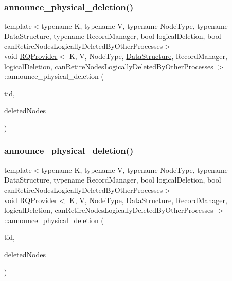 \subsubsection{\texorpdfstring{announce\+\_\+physical\+\_\+deletion()}{announce\_physical\_deletion()}\hspace{0.1cm}{\footnotesize\ttfamily [2/5]}}
{\footnotesize\ttfamily template$<$typename K, typename V, typename Node\+Type, typename Data\+Structure, typename Record\+Manager, bool logical\+Deletion, bool can\+Retire\+Nodes\+Logically\+Deleted\+By\+Other\+Processes$>$ \\
void \hyperlink{classRQProvider}{R\+Q\+Provider}$<$ K, V, Node\+Type, \hyperlink{classDataStructure}{Data\+Structure}, Record\+Manager, logical\+Deletion, can\+Retire\+Nodes\+Logically\+Deleted\+By\+Other\+Processes $>$\+::announce\+\_\+physical\+\_\+deletion (\begin{DoxyParamCaption}\item[{const int}]{tid,  }\item[{Node\+Type $\ast$const $\ast$const}]{deleted\+Nodes }\end{DoxyParamCaption})\hspace{0.3cm}{\ttfamily [inline]}}

\mbox{\label{classRQProvider_a29337e6766144d1c1a9aa752fe73fabf}} 
\subsubsection{\texorpdfstring{announce\+\_\+physical\+\_\+deletion()}{announce\_physical\_deletion()}\hspace{0.1cm}{\footnotesize\ttfamily [3/5]}}
{\footnotesize\ttfamily template$<$typename K, typename V, typename Node\+Type, typename Data\+Structure, typename Record\+Manager, bool logical\+Deletion, bool can\+Retire\+Nodes\+Logically\+Deleted\+By\+Other\+Processes$>$ \\
void \hyperlink{classRQProvider}{R\+Q\+Provider}$<$ K, V, Node\+Type, \hyperlink{classDataStructure}{Data\+Structure}, Record\+Manager, logical\+Deletion, can\+Retire\+Nodes\+Logically\+Deleted\+By\+Other\+Processes $>$\+::announce\+\_\+physical\+\_\+deletion (\begin{DoxyParamCaption}\item[{const int}]{tid,  }\item[{Node\+Type $\ast$const $\ast$const}]{deleted\+Nodes }\end{DoxyParamCaption})\hspace{0.3cm}{\ttfamily [inline]}}

